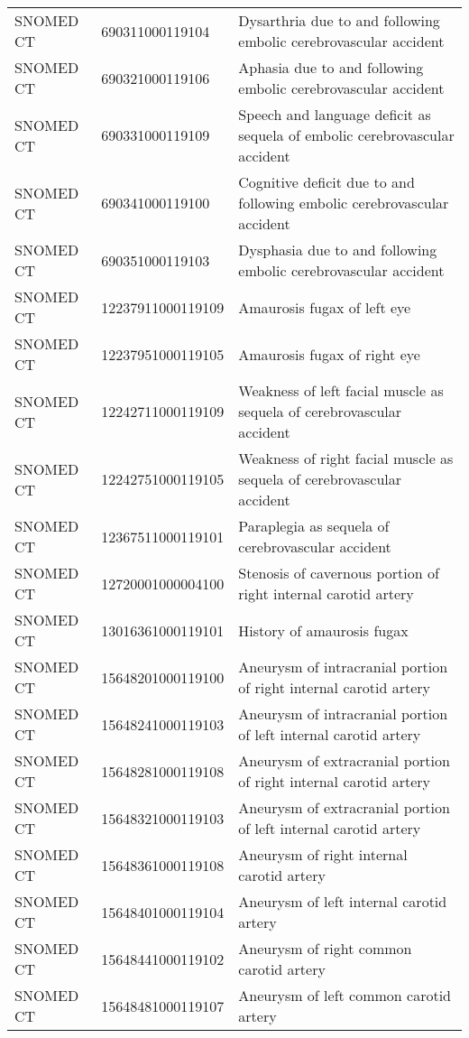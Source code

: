 \begin{longtable}{p{}p{}p{}}
  SNOMED CT & 690311000119104 & Dysarthria due to and following embolic cerebrovascular accident \\ 
  SNOMED CT & 690321000119106 & Aphasia due to and following embolic cerebrovascular accident \\ 
  SNOMED CT & 690331000119109 & Speech and language deficit as sequela of embolic cerebrovascular accident \\ 
  SNOMED CT & 690341000119100 & Cognitive deficit due to and following embolic cerebrovascular accident \\ 
  SNOMED CT & 690351000119103 & Dysphasia due to and following embolic cerebrovascular accident \\ 
  SNOMED CT & 12237911000119109 & Amaurosis fugax of left eye \\ 
  SNOMED CT & 12237951000119105 & Amaurosis fugax of right eye \\ 
  SNOMED CT & 12242711000119109 & Weakness of left facial muscle as sequela of cerebrovascular accident \\ 
  SNOMED CT & 12242751000119105 & Weakness of right facial muscle as sequela of cerebrovascular accident \\ 
  SNOMED CT & 12367511000119101 & Paraplegia as sequela of cerebrovascular accident \\ 
  SNOMED CT & 12720001000004100 & Stenosis of cavernous portion of right internal carotid artery \\ 
  SNOMED CT & 13016361000119101 & History of amaurosis fugax \\ 
  SNOMED CT & 15648201000119100 & Aneurysm of intracranial portion of right internal carotid artery \\ 
  SNOMED CT & 15648241000119103 & Aneurysm of intracranial portion of left internal carotid artery \\ 
  SNOMED CT & 15648281000119108 & Aneurysm of extracranial portion of right internal carotid artery \\ 
  SNOMED CT & 15648321000119103 & Aneurysm of extracranial portion of left internal carotid artery \\ 
  SNOMED CT & 15648361000119108 & Aneurysm of right internal carotid artery \\ 
  SNOMED CT & 15648401000119104 & Aneurysm of left internal carotid artery \\ 
  SNOMED CT & 15648441000119102 & Aneurysm of right common carotid artery \\ 
  SNOMED CT & 15648481000119107 & Aneurysm of left common carotid artery \\ 

\end{longtable}
